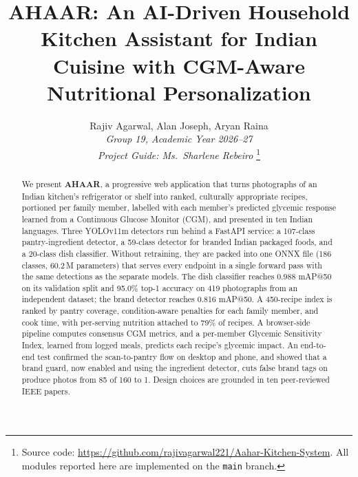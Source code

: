 \documentclass[journal]{IEEEtran}
\begin{document}
\title{AHAAR: An AI-Driven Household Kitchen Assistant for Indian Cuisine with CGM-Aware Nutritional Personalization}

\author{%
  Rajiv Agarwal, Alan Joseph, Aryan Raina\\
  \textit{Group 19, Academic Year 2026--27}\\
  \textit{Project Guide: Ms.\ Sharlene Rebeiro}%
  \thanks{Source code: \url{https://github.com/rajivagarwal221/Aahar-Kitchen-System}.
  All modules reported here are implemented on the \texttt{main}
  branch.}
}


\maketitle

\begin{abstract}
We present \textbf{AHAAR}, a progressive web application that turns
photographs of an Indian kitchen's refrigerator or shelf into ranked,
culturally appropriate recipes, portioned per family member,
labelled with each member's predicted glycemic response learned from
a Continuous Glucose Monitor (CGM), and presented in ten Indian
languages. Three YOLOv11m detectors run behind a FastAPI service: a
107-class pantry-ingredient detector, a 59-class detector for branded
Indian packaged foods, and a 20-class dish classifier. Without
retraining, they are packed into one ONNX file (186 classes, 60.2\,M
parameters) that serves every endpoint in a single forward pass with
the same detections as the separate models. The dish classifier
reaches 0.988 mAP@50 on its validation split and 95.0\% top-1
accuracy on 419 photographs from an independent dataset; the brand
detector reaches 0.816 mAP@50. A 450-recipe index is ranked by pantry
coverage, condition-aware penalties for each family member, and cook
time, with per-serving nutrition attached to 79\% of recipes. A
browser-side pipeline computes consensus CGM metrics, and a
per-member Glycemic Sensitivity Index, learned from logged meals,
predicts each recipe's glycemic impact. An end-to-end test confirmed
the scan-to-pantry flow on desktop and phone, and showed that a brand guard,
now enabled and using the ingredient detector, cuts false brand tags on produce photos
from 85 of 160 to 1. Design choices are grounded in ten peer-reviewed
IEEE papers.
\end{abstract}
\end{document}
